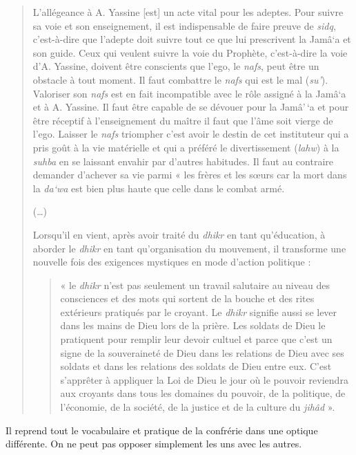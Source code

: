 \begin{quote}
L'allégeance à A. Yassine {[}est{]} un acte vital pour les adeptes. Pour suivre sa voie et son enseignement, il est indispensable de faire preuve de \emph{sidq}, c'est-à-dire que l'adepte doit suivre tout ce que lui prescrivent la Jamâ`a et son guide. Ceux qui veulent suivre la voie du
Prophète, c'est-à-dire la voie d'A. Yassine, doivent être conscients que l'ego, le \emph{nafs}, peut être un obstacle à tout moment. Il faut combattre le \emph{nafs} qui est le mal (\emph{su'}). Valoriser son \emph{nafs} est en fait incompatible avec le rôle assigné à la Jamâ`a et
à A. Yassine. Il faut être capable de se dévouer pour la Jamâ'\,`a et pour être réceptif à l'enseignement du maître il faut que l'âme soit vierge de l'ego. Laisser le \emph{nafs} triompher c'est avoir le destin
de cet instituteur qui a pris goût à la vie matérielle et qui a préféré le divertissement (\emph{lahw}) à la \emph{suhba} en se laissant envahir
par d'autres habitudes. Il faut au contraire demander d'achever sa vie
parmi « les frères et les sœurs car la mort dans la \emph{da`wa} est
bien plus haute que celle dans le combat armé.

(\ldots)

Lorsqu'il en vient, après avoir traité du \emph{dhikr} en tant
qu'éducation, à aborder le \emph{dhikr} en tant qu'organisation du
mouvement, il transforme une nouvelle fois des exigences mystiques en
mode d'action politique :
\begin{quote}
    « le \emph{dhikr} n'est pas seulement un
travail salutaire au niveau des consciences et des mots qui sortent de
la bouche et des rites extérieurs pratiqués par le croyant. Le
\emph{dhikr} signifie aussi se lever dans les mains de Dieu lors de la prière. Les soldats de Dieu le pratiquent pour remplir leur devoir
cultuel et parce que c'est un signe de la souveraineté de Dieu dans les relations de Dieu avec ses soldats et dans les relations des soldats de
Dieu entre eux. C'est s'apprêter à appliquer la Loi de Dieu le jour où le pouvoir reviendra aux croyants dans tous les domaines du pouvoir, de
la politique, de l'économie, de la société, de la justice et de la culture du \emph{jihâd} ».
\end{quote}

\end{quote}
\begin{Synthesis}
Il reprend tout le vocabulaire et pratique de la confrérie dans une optique différente. On ne peut pas opposer simplement les uns avec les autres. 
\end{Synthesis}